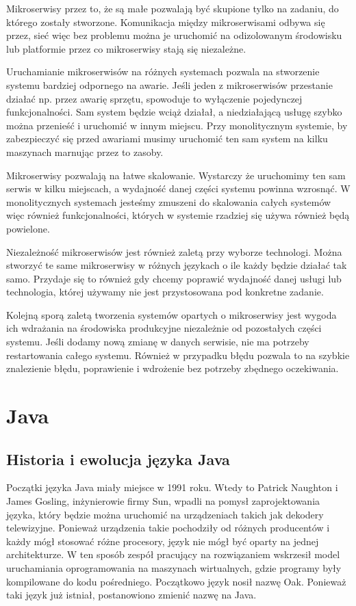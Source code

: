 Mikroserwisy przez to, że są małe pozwalają być skupione tylko na zadaniu, do którego zostały stworzone. Komunikacja między mikroserwisami odbywa się przez, sieć więc bez problemu można je uruchomić na odizolowanym środowisku lub platformie przez co mikroserwisy stają się niezależne. 

 Uruchamianie mikroserwisów na różnych systemach pozwala na stworzenie systemu bardziej odpornego na awarie. Jeśli jeden z mikroserwisów przestanie działać np. przez awarię sprzętu, spowoduje to wyłączenie pojedynczej funkcjonalności. Sam system będzie wciąż działał, a niedziałającą usługę szybko można przenieść i uruchomić w innym miejscu. Przy monolitycznym systemie, by zabezpieczyć się przed awariami musimy uruchomić ten sam system na kilku maszynach marnując przez to zasoby.

Mikroserwisy pozwalają na łatwe skalowanie. Wystarczy że uruchomimy ten sam serwis w kilku miejscach, a wydajność danej części systemu powinna wzrosnąć. W monolitycznych systemach jesteśmy zmuszeni do skalowania całych systemów więc również funkcjonalności, których w systemie rzadziej się używa również będą powielone.

Niezależność mikroserwisów jest również zaletą przy wyborze technologi. Można stworzyć te same mikroserwisy w różnych językach o ile każdy będzie działać tak samo. Przydaje się to również gdy chcemy poprawić wydajność danej usługi lub technologia, której używamy nie jest przystosowana pod konkretne zadanie. 

Kolejną sporą zaletą tworzenia systemów opartych o mikroserwisy jest wygoda ich wdrażania na środowiska produkcyjne niezależnie od pozostałych części systemu. Jeśli dodamy nową zmianę w danych serwisie, nie ma potrzeby restartowania całego systemu. Również w przypadku błędu pozwala to na szybkie znalezienie błędu, poprawienie i wdrożenie bez potrzeby zbędnego oczekiwania. 

\section{Java}
\subsection{Historia i ewolucja języka Java}
Początki języka Java miały miejsce w 1991 roku. Wtedy to Patrick Naughton i James Gosling, inżynierowie firmy Sun,  wpadli na pomysł zaprojektowania języka, który będzie można uruchomić na urządzeniach takich jak dekodery telewizyjne\cite{java8}. Ponieważ urządzenia takie pochodziły od różnych producentów i każdy mógł stosować różne procesory, język nie mógł być oparty na jednej architekturze. W ten sposób zespół pracujący na rozwiązaniem wskrzesił model uruchamiania oprogramowania na maszynach wirtualnych, gdzie programy były kompilowane do kodu pośredniego.  
Początkowo język nosił nazwę Oak. Ponieważ taki język już istniał, postanowiono zmienić nazwę na Java.

